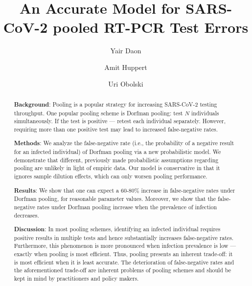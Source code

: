 \documentclass{article}
\begin{document}
\title{An Accurate Model for SARS-CoV-2 pooled RT-PCR Test Errors}

\author[1,2]{Yair Daon}
\author[2,3,*]{Amit Huppert}
\author[1,2,*]{Uri Obolski}



\date{}

\maketitle

\begin{abstract}
\textbf{Background}: Pooling is a popular strategy for increasing
SARS-CoV-2 testing throughput. One popular pooling scheme is Dorfman
pooling: test $N$ individuals simultaneously. If the test is positive
--- retest each individual separately. However, requiring more than
one positive test may lead to increased false-negative rates.

\textbf{Methods}: We analyze the false-negative rate (i.e., the
probability of a negative result for an infected individual) of
Dorfman pooling via a new probabilistic model. We demonstrate that
different, previously made probabilistic assumptions regarding pooling
are unlikely in light of empiric data. Our model is conservative in
that it ignores sample dilution effects, which can only worsen pooling
performance.

\textbf{Results}: We show that one can expect a 60-80\% increase in
false-negative rates under Dorfman pooling, for reasonable parameter
values. Moreover, we show that the false-negative rates under Dorfman
pooling increase when the prevalence of infection decreases.

\textbf{Discussion}: In most pooling schemes, identifying an infected
individual requires positive results in multiple tests and hence
substantially increases false-negative rates. Furthermore, this
phenomenon is more pronounced when infection prevalence is low ---
exactly when pooling is most efficient. Thus, pooling presents an
inherent trade-off: it is most efficient when it is least
accurate. The deterioration of false-negative rates and the
aforementioned trade-off are inherent problems of pooling schemes and
should be kept in mind by practitioners and policy makers.
\end{abstract}
\newpage
\end{document}
